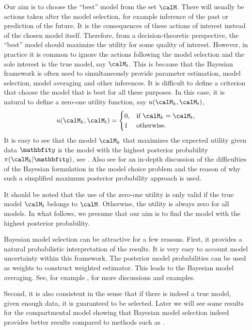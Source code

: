 Our aim is to choose the ``best'' model from the set $\calM$. There will
usually be actions taken after the model selection, for example inference of
the past or prediction of the future. It is the consequences of these actions
of interest instead of the chosen model itself. Therefore, from a
decision-theoretic perspective, the ``best'' model should maximize the utility
for some quality of interest. However, in practice it is common to ignore the
actions following the model selection and the sole interest is the true model,
say $\calM_t$. This is because that the Bayesian framework is often used to
simultaneously provide parameter estimation, model selection, model averaging
and other inferences. It is difficult to define a criterion that choose the
model that is best for all these purposes. In this case, it is natural to
define a zero-one utility function, say $u(\calM_k,\calM_t)$,
\begin{equation}
  u(\calM_k,\calM_t) =
  \begin{cases}
    0, &\text{if } \calM_k = \calM_t,\\
    1  &\text{otherwise.}
  \end{cases}
\end{equation}
It is easy to see that the model $\calM_k$ that maximizes the expected utility
given data $\data$ is the model with the highest posterior probability
$\pi(\calM_k|\data)$, see \cite[][chap.~6]{Bernardo:1994vd}. Also see
\cite[][sec.~7.2.1]{Robert:2007tc} for an in-depth discussion of the
difficulties of the Bayesian formulation in the model choice problem and the
reason of why such a simplified maximum posterior probability approach is
used.

It should be noted that the use of the zero-one utility is only valid if the
true model $\calM_t$ belongs to $\calM$. Otherwise, the utility is always zero
for all models. In what follows, we presume that our aim is to find the model
with the highest posterior probability.

Bayesian model selection can be attractive for a few reasons. First, it
provides a natural probabilistic interpretation of the results. It is very
easy to account model uncertainty within this framework. The posterior model
probabilities can be used as weights to construct weighted estimator. This
leads to the Bayesian model averaging. See, for example
\cite{Raftery:1997vx,Clyde:1999vx,Draper:1995vx}, for more discussions and
examples.

Second, it is also consistent in the sense that if there is indeed a true
model, given enough data, it is guaranteed to be selected. Later we will see
some results for the \pet compartmental model showing that Bayesian model
selection indeed provides better results compared to methods such as \aic.

